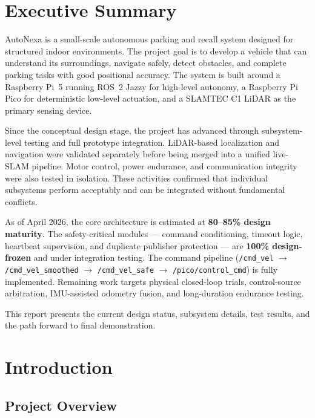 \documentclass[12pt,a4paper]{report}
\newcommand{\pname}{AutoNexa}
\newcommand{\reportdate}{April 2026}
\begin{document}
\chapter*{Executive Summary}

\pname{} is a small-scale autonomous parking and recall system designed for structured indoor environments. The project goal is to develop a vehicle that can understand its surroundings, navigate safely, detect obstacles, and complete parking tasks with good positional accuracy. The system is built around a Raspberry Pi~5 running ROS~2 Jazzy for high-level autonomy, a Raspberry Pi Pico for deterministic low-level actuation, and a SLAMTEC C1 LiDAR as the primary sensing device.

Since the conceptual design stage, the project has advanced through subsystem-level testing and full prototype integration. LiDAR-based localization and navigation were validated separately before being merged into a unified live-SLAM pipeline. Motor control, power endurance, and communication integrity were also tested in isolation. These activities confirmed that individual subsystems perform acceptably and can be integrated without fundamental conflicts.

As of \reportdate, the core architecture is estimated at \textbf{80--85\% design maturity}. The safety-critical modules --- command conditioning, timeout logic, heartbeat supervision, and duplicate publisher protection --- are \textbf{100\% design-frozen} and under integration testing. The command pipeline (\texttt{/cmd\_vel} $\rightarrow$ \texttt{/cmd\_vel\_smoothed} $\rightarrow$ \texttt{/cmd\_vel\_safe} $\rightarrow$ \texttt{/pico/control\_cmd}) is fully implemented. Remaining work targets physical closed-loop trials, control-source arbitration, IMU-assisted odometry fusion, and long-duration endurance testing.

This report presents the current design status, subsystem details, test results, and the path forward to final demonstration.

\chapter{Introduction}

\section{Project Overview}
\end{document}
